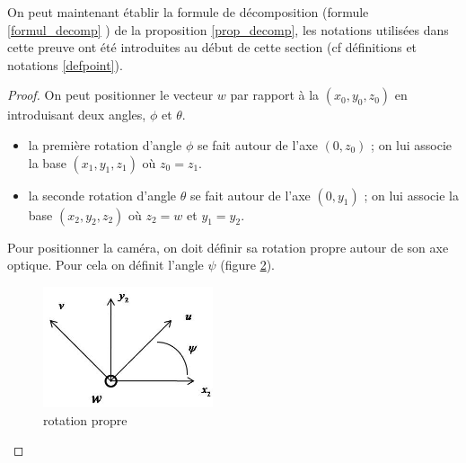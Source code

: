 On peut maintenant établir la formule de décomposition (formule \ref{formul_decomp} ) de la proposition \ref{prop_decomp}, les notations utilisées dans cette preuve ont été introduites au début de cette section (cf définitions et notations \ref{defpoint}).

\begin{proof}
On peut positionner le vecteur $w$ par rapport à la $(x_{0},y_{0},z_{0}) $ en introduisant deux angles, $\phi$ et $\theta$.

\begin{itemize}
\item la première rotation d'angle $\phi$ se fait autour de l'axe $(0,z_{0})$ ; on lui associe la base $(x_{1},y_{1},z_{1})$ où $z_{0}=z_{1}$.
\item la seconde rotation d'angle $\theta$ se fait autour de l'axe $(0,y_1)$ ; on lui associe la base $(x_{2},y_{2},z_{2})$ où $z_{2}=w$ et $y_{1}=y_{2}$.
\end{itemize}

\begin{figure}[h!]
\centering
{}
\label{img_angles}
\end{figure}

Pour positionner la caméra, on doit définir sa rotation propre autour de son axe optique. Pour cela on définit l'angle $\psi$ (figure \ref{decompgeo_rotationPropre}).
\begin{figure}[h!]
\centering
\includegraphics[width=5cm]{graphe3.jpg}
\caption{rotation propre}
\label{decompgeo_rotationPropre}
\end{figure}


\end{proof}

